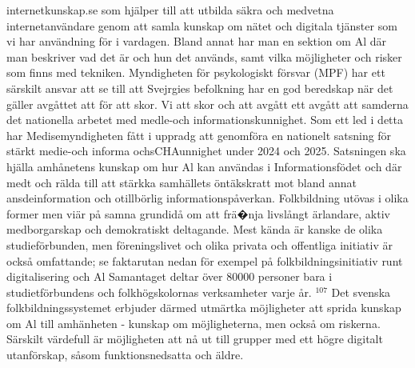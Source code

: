 {{{{{{{{internetkunskap.se som hjälper till att utbilda säkra och medvetna internetanvändare genom att samla kunskap om nätet och digitala tjänster som vi har användning för i vardagen. Bland annat har man en sektion om Al där man beskriver vad det är och hun det används, samt vilka möjligheter och risker som finns med tekniken. Myndigheten för psykologiskt försvar (MPF) har ett särskilt ansvar att se till att Svejrgies befolkning har en god beredskap när det gäller avgåttet att för att skor. Vi att skor och att avgått ett avgått att samderna det nationella arbetet med medle-och informationskunnighet. Som ett led i detta har Medisemyndigheten fått i uppradg att genomföra en nationelt satsning för stärkt medie-och informa ochsCHAunnighet under 2024 och 2025. Satsningen ska hjälla amhånetens kunskap om hur Al kan användas i Informationsfödet och där medt och rälda till att stärkka samhällets öntäkskratt mot bland annat ansdeinformation och otillbörlig informationspåverkan.
Folkbildning utövas i olika former men viär på samna grundidå om att frä�nja livslångt ärlandare, aktiv medborgarskap och demokratiskt deltagande. Mest kända är kanske de olika studieförbunden, men föreningslivet och olika privata och offentliga initiativ är också omfattande; se faktarutan nedan för exempel på folkbildningsinitiativ runt digitalisering och Al Samantaget deltar över 80000 personer bara i studietförbundens och folkhögskolornas verksamheter varje år. \({ }^{107}\) Det svenska folkbildningssystemet erbjuder därmed utmärtka möjligheter att sprida kunskap om Al till amhänheten - kunskap om möjligheterna, men också om riskerna. Särskilt värdefull är möjligheten att nå ut till grupper med ett högre digitalt utanförskap, såsom funktionsnedsatta och äldre.
}}}}}}}}
